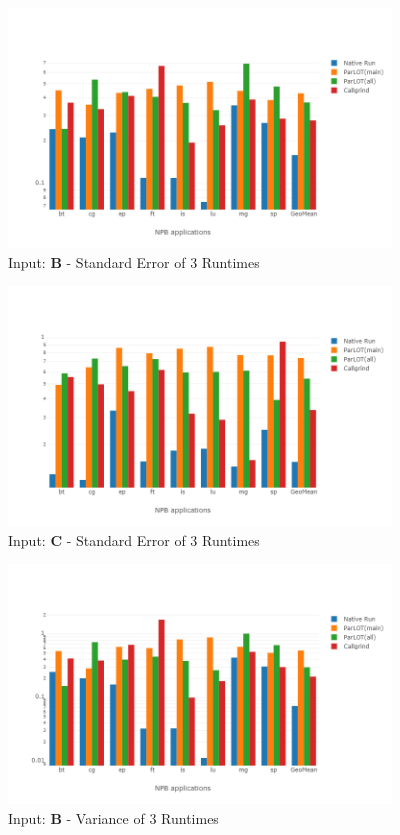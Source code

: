 \begin{figure}[!t]
\centering
\includegraphics[width=4in]{figs.comet/comet_chartAvg_serr_B_p3_5.png}
\caption{ Input: \textbf{B}  - Standard Error of 3 Runtimes
}
\label{comet_chartAvg_serr_B_p3_5}
\end{figure}




\begin{figure}[!t]
\centering
\includegraphics[width=4in]{figs.comet/comet_chartAvg_serr_C_p3_5.png}
\caption{ Input: \textbf{C}  - Standard Error of 3 Runtimes
}
\label{comet_chartAvg_serr_C_p3_5}
\end{figure}





\begin{figure}[!t]
\centering
\includegraphics[width=4in]{figs.comet/comet_chartAvg_var_B_p3_5.png}
\caption{ Input: \textbf{B}  - Variance of 3 Runtimes
}
\label{comet_chartAvg_var_B_p3_5}
\end{figure}


